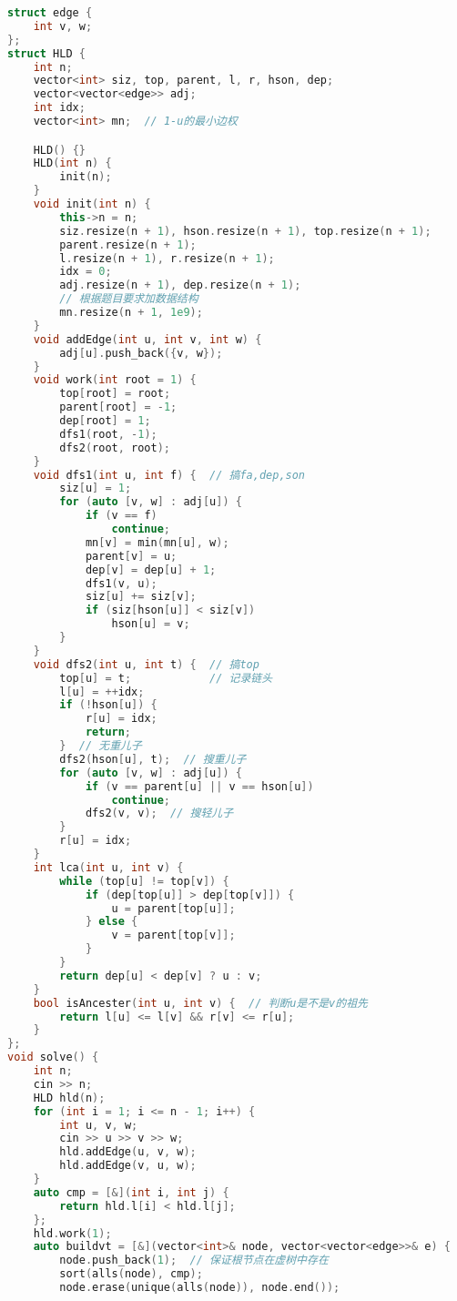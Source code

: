 \begin{lstlisting}[language=C++]
struct edge {
    int v, w;
};
struct HLD {
    int n;
    vector<int> siz, top, parent, l, r, hson, dep;
    vector<vector<edge>> adj;
    int idx;
    vector<int> mn;  // 1-u的最小边权

    HLD() {}
    HLD(int n) {
        init(n);
    }
    void init(int n) {
        this->n = n;
        siz.resize(n + 1), hson.resize(n + 1), top.resize(n + 1);
        parent.resize(n + 1);
        l.resize(n + 1), r.resize(n + 1);
        idx = 0;
        adj.resize(n + 1), dep.resize(n + 1);
        // 根据题目要求加数据结构
        mn.resize(n + 1, 1e9);
    }
    void addEdge(int u, int v, int w) {
        adj[u].push_back({v, w});
    }
    void work(int root = 1) {
        top[root] = root;
        parent[root] = -1;
        dep[root] = 1;
        dfs1(root, -1);
        dfs2(root, root);
    }
    void dfs1(int u, int f) {  // 搞fa,dep,son
        siz[u] = 1;
        for (auto [v, w] : adj[u]) {
            if (v == f)
                continue;
            mn[v] = min(mn[u], w);
            parent[v] = u;
            dep[v] = dep[u] + 1;
            dfs1(v, u);
            siz[u] += siz[v];
            if (siz[hson[u]] < siz[v])
                hson[u] = v;
        }
    }
    void dfs2(int u, int t) {  // 搞top
        top[u] = t;            // 记录链头
        l[u] = ++idx;
        if (!hson[u]) {
            r[u] = idx;
            return;
        }  // 无重儿子
        dfs2(hson[u], t);  // 搜重儿子
        for (auto [v, w] : adj[u]) {
            if (v == parent[u] || v == hson[u])
                continue;
            dfs2(v, v);  // 搜轻儿子
        }
        r[u] = idx;
    }
    int lca(int u, int v) {
        while (top[u] != top[v]) {
            if (dep[top[u]] > dep[top[v]]) {
                u = parent[top[u]];
            } else {
                v = parent[top[v]];
            }
        }
        return dep[u] < dep[v] ? u : v;
    }
    bool isAncester(int u, int v) {  // 判断u是不是v的祖先
        return l[u] <= l[v] && r[v] <= r[u];
    }
};
void solve() {
    int n;
    cin >> n;
    HLD hld(n);
    for (int i = 1; i <= n - 1; i++) {
        int u, v, w;
        cin >> u >> v >> w;
        hld.addEdge(u, v, w);
        hld.addEdge(v, u, w);
    }
    auto cmp = [&](int i, int j) {
        return hld.l[i] < hld.l[j];
    };
    hld.work(1);
    auto buildvt = [&](vector<int>& node, vector<vector<edge>>& e) {
        node.push_back(1);  // 保证根节点在虚树中存在
        sort(alls(node), cmp);
        node.erase(unique(alls(node)), node.end());

\end{lstlisting}
